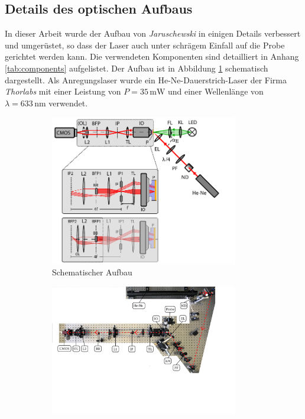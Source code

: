 \documentclass[titlepage,  ngerman]{article}
\begin{document}
	\subsection{Details des optischen Aufbaus}
	In dieser Arbeit wurde der Aufbau von \textit{Jaruschewski} \cite{Jaruschewski.2020} in einigen Details verbessert und umgerüstet, so dass der Laser auch unter schrägem Einfall auf die Probe gerichtet werden kann. Die verwendeten Komponenten sind detailliert in Anhang \ref{tab:components} aufgelistet. Der Aufbau ist in Abbildung \ref{fig:aufbau_schema} schematisch dargestellt. Als Anregungslaser wurde ein He-Ne-Dauerstrich-Laser der Firma \textit{Thorlabs} mit einer Leistung von $P = 35 \,\mathrm{mW}$ und einer Wellenlänge von $\lambda = 633\,\mathrm{nm}$ verwendet.
	\begin{figure}[h]
		\centering
		\begin{subfigure}{0.9\textwidth}		
			\centering
			\includegraphics[width=0.9\textwidth]{figures/Aufbau_Schema.pdf}
			\caption{Schematischer Aufbau}			
			\label{fig:aufbau_schema}
		\end{subfigure}
		\vfil
		\begin{subfigure}{0.9\textwidth} 
			\centering
			\includegraphics[width=0.9\textwidth]{figures/aufsicht_aufbau_anotated.jpg}

\end{subfigure}
\end{figure}
\end{document}
